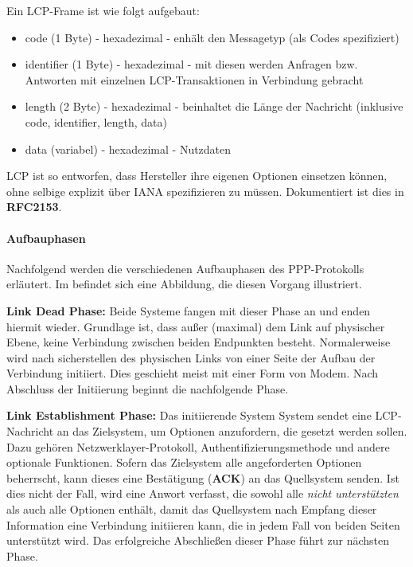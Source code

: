 Ein LCP-Frame ist wie folgt aufgebaut:
\begin{itemize}
	\item code (1 Byte) - hexadezimal - enhält den Messagetyp (als Codes spezifiziert)
	\item identifier (1 Byte) - hexadezimal - mit diesen werden Anfragen bzw. Antworten mit einzelnen LCP-Transaktionen in Verbindung gebracht
	\item length (2 Byte) - hexadezimal - beinhaltet die Länge der Nachricht (inklusive code, identifier, length, data)
	\item data (variabel) - hexadezimal - Nutzdaten
\end{itemize}

\ac{LCP} ist so entworfen, dass Hersteller ihre eigenen Optionen einsetzen können, ohne
selbige explizit über \ac{IANA} spezifizieren zu müssen. Dokumentiert ist dies in \textbf{RFC2153}.

\paragraph{Aufbauphasen} Nachfolgend werden die verschiedenen Aufbauphasen des
PPP-Protokolls erläutert. Im  befindet
sich eine Abbildung, die diesen Vorgang illustriert.

\textbf{Link Dead Phase:}
Beide Systeme fangen mit dieser Phase an und enden hiermit wieder.
Grundlage ist, dass außer (maximal) dem Link auf physischer Ebene,
keine Verbindung zwischen beiden Endpunkten besteht. Normalerweise
wird nach sicherstellen des physischen Links von einer Seite der
Aufbau der Verbindung initiiert. Dies geschieht meist mit einer Form von Modem.
Nach Abschluss der Initiierung beginnt die nachfolgende Phase.

\textbf{Link Establishment Phase:}
Das initiierende System System sendet eine \ac{LCP}-Nachricht an das Zielsystem,
um Optionen anzufordern, die gesetzt werden sollen. Dazu gehören
Netzwerklayer-Protokoll, Authentifizierungsmethode und andere optionale
Funktionen. Sofern das Zielsystem alle angeforderten Optionen beherrscht,
kann dieses eine Bestätigung (\textbf{ACK}) an das Quellsystem senden.
Ist dies nicht der Fall, wird eine Anwort verfasst, die sowohl alle
\textit{nicht unterstützten} als auch alle  Optionen
enthält, damit das Quellsystem nach Empfang dieser Information eine
Verbindung initiieren kann, die in jedem Fall von beiden Seiten unterstützt
wird. Das erfolgreiche Abschließen dieser Phase führt zur nächsten Phase.


